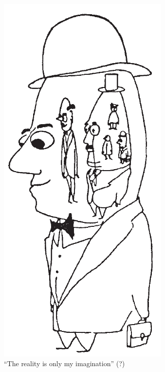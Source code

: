 \documentclass[
	11pt,
	aspectratio=169,
]{beamer}
\begin{document}
\begin{frame}
\begin{columns}
            				\centering\includegraphics[height=0.5\textheight]{./resources/man.png}\\
                			``The reality is only my imagination'' (?)
                    \end{columns}
                \end{frame}
\end{document}
